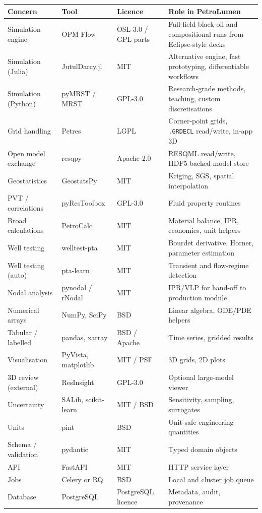 \documentclass[11pt,a4paper]{article}
\begin{document}
\begin{longtable}{@{}p{3.6cm}p{3.4cm}p{2.2cm}p{5.6cm}@{}}
\toprule
\textbf{Concern} & \textbf{Tool} & \textbf{Licence} & \textbf{Role in PetroLumen}\\
\midrule
\endhead
Simulation engine   & OPM Flow          & OSL-3.0 / GPL parts & Full-field black-oil and compositional runs from Eclipse-style decks\\
Simulation (Julia)  & JutulDarcy.jl     & MIT                & Alternative engine, fast prototyping, differentiable workflows\\
Simulation (Python) & pyMRST / MRST     & GPL-3.0            & Research-grade methods, teaching, custom discretisations\\
Grid handling       & Petres            & LGPL               & Corner-point grids, \texttt{.GRDECL} read/write, in-app 3D\\
Open model exchange & resqpy            & Apache-2.0         & RESQML read/write, HDF5-backed model store\\
Geostatistics       & GeostatsPy        & MIT                & Kriging, SGS, spatial interpolation\\
PVT / correlations  & pyResToolbox      & GPL-3.0            & Fluid property routines\\
Broad calculations  & PetroCalc         & MIT                & Material balance, IPR, economics, unit helpers\\
Well testing        & welltest-pta      & MIT                & Bourdet derivative, Horner, parameter estimation\\
Well testing (auto) & pta-learn         & MIT                & Transient and flow-regime detection\\
Nodal analysis      & pynodal / rNodal  & MIT                & IPR/VLP for hand-off to production module\\
Numerical arrays    & NumPy, SciPy      & BSD                & Linear algebra, ODE/PDE helpers\\
Tabular / labelled  & pandas, xarray    & BSD / Apache       & Time series, gridded results\\
Visualisation       & PyVista, matplotlib & MIT / PSF        & 3D grids, 2D plots\\
3D review (external) & ResInsight       & GPL-3.0            & Optional large-model viewer\\
Uncertainty         & SALib, scikit-learn & MIT / BSD        & Sensitivity, sampling, surrogates\\
Units               & pint              & BSD                & Unit-safe engineering quantities\\
Schema / validation & pydantic          & MIT                & Typed domain objects\\
API                 & FastAPI           & MIT                & HTTP service layer\\
Jobs                & Celery or RQ      & BSD                & Local and cluster job queue\\
Database            & PostgreSQL        & PostgreSQL licence & Metadata, audit, provenance\\
\bottomrule
\end{longtable}
\end{document}
